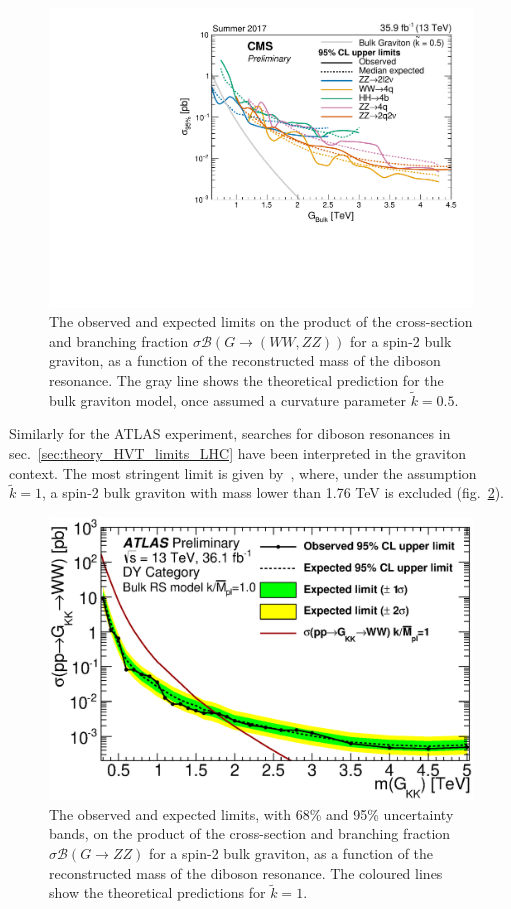 \begin{figure}[!htb]
  \centering
    \includegraphics[width=.495\textwidth]{figures/combiLimitsBulkG_BulkG.pdf}
  \caption{The observed and expected limits on the product of the cross-section and branching fraction $\sigma \mathcal{B} (G \rightarrow (WW, ZZ))$ for a spin-2 bulk graviton, as a function of the reconstructed mass of the diboson resonance. The gray line shows the theoretical prediction for the bulk graviton model, once assumed a curvature parameter $\tilde{k}=0.5$.}
  \label{fig:theory_CMS_Diboson_Summary_graviton}
\end{figure}

\vspace*{1\baselineskip}

\noindent Similarly for the ATLAS experiment, searches for diboson resonances in sec.~\ref{sec:theory_HVT_limits_LHC} have been interpreted in the graviton context. The most stringent limit is given by~\cite{ATLAS-CONF-2017-051}, where, under the assumption $\tilde{k}=1$, a spin-2 bulk graviton with mass lower than 1.76 TeV is excluded (fig.~\ref{fig:theory_ATLAS-CONF-2017-051}).

\begin{figure}[!htb]
  \centering
    \includegraphics[width=.495\textwidth]{figures/ATLAS-CONF-2017-051_graviton.eps}
  \caption{The observed and expected limits, with 68\% and 95\% uncertainty bands, on the product of the cross-section and branching fraction $\sigma \mathcal{B} (G \rightarrow ZZ)$ for a spin-2 bulk graviton, as a function of the reconstructed mass of the diboson resonance. The coloured lines show the theoretical predictions for $\tilde{k}=1$.}
  \label{fig:theory_ATLAS-CONF-2017-051}
\end{figure}

